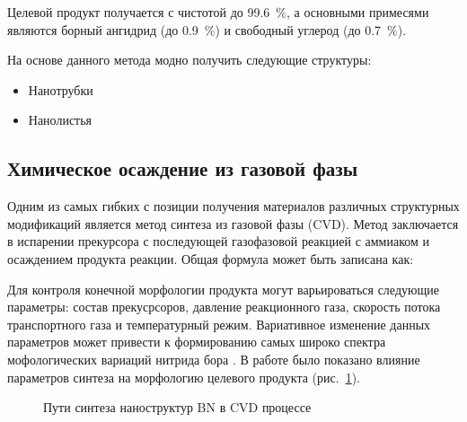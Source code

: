 Целевой продукт получается с чистотой до \SI{99.6}{\%}, а основными примесями являются 
борный ангидрид (до \SI{0.9}{\%}) и свободный углерод (до \SI{0.7}{\%}).

На основе данного метода модно получить следующие структуры:

\begin{itemize}
    \item Нанотрубки \cite[]{kim_boron_2018, yeh_stable_2017} 
    \item Нанолистья \cite[]{merenkov_orientation-controlled_2019}
\end{itemize}


\subsection{Химическое осаждение из газовой фазы}%
\label{sub:Химическое осаждение из газовой фазы}

Одним из самых гибких с позиции получения материалов различных структурных
модификаций является метод синтеза  из газовой фазы (CVD).
Метод заключается в испарении прекурсора с последующей газофазовой реакцией с аммиаком и
осаждением продукта реакции. Общая формула может быть записана как:


Для контроля конечной морфологии продукта могут варьироваться следующие параметры:
состав прекусрсоров, давление реакционного газа, скорость потока транспортного газа и
температурный режим. Вариативное изменение данных параметров может привести к формированию
самых широко спектра мофологических вариаций нитрида бора \cite[]{kovalskii_growth_2016}.
В работе \cite[]{kovalskii_growth_2016} было показано влияние параметров синтеза
на морфологию целевого продукта (рис.~\ref{fig:BNO}).

\begin{figure}[ht]
    \caption{Пути синтеза наноструктур BN в CVD процессе
    }
    \label{fig:BNO}
\end{figure}

